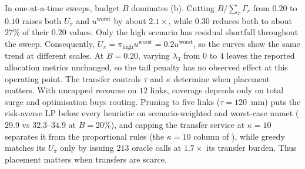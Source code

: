 In one-at-a-time sweeps, budget $B$ dominates
(b). Cutting $B/\sum_r \Gamma_r$ from $0.20$ to
$0.10$ raises both $U_\pi$ and $u^{\text{worst}}$ by about
$2.1\times$, while $0.30$ reduces both to about $27\%$ of their
$0.20$ values. Only the high scenario has residual
shortfall throughout the sweep. Consequently,
$U_\pi=\pi_{\mathrm{high}}u^{\mathrm{worst}}
=0.2u^{\mathrm{worst}}$, so the curves show the same trend at different
scales.
At $B=0.20$, varying $\lambda_3$ from $0$ to $4$ leaves the reported
allocation metrics unchanged, so the tail penalty has no observed effect
at this operating point.
The transfer controls $\tau$ and $\kappa$ determine when placement
matters. With uncapped recourse on $12$ links, coverage depends only on
total surge and optimisation buys routing. Pruning to five links
($\tau{=}120$~min) puts the
risk-averse LP below every heuristic on scenario-weighted and worst-case unmet
($29.9$ vs $32.3$--$34.9$ at $B{=}20\%$), and capping the transfer
service at $\kappa{=}10$ separates it from the proportional rules (the
$\kappa{=}10$ column of ), while greedy matches
its $U_\pi$ only by
issuing $213$ oracle calls at $1.7\times$ its transfer burden.
Thus placement matters when transfers are scarce.


